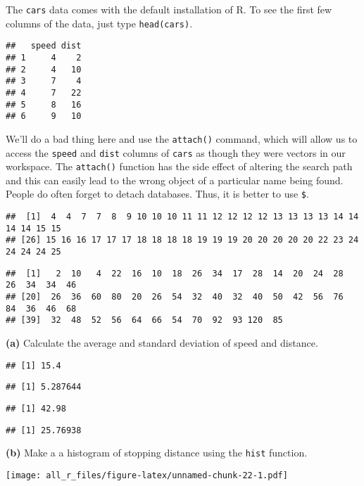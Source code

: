 \documentclass[
]{article}
\begin{document}
The \texttt{cars} data comes with the default installation of R. To see
the first few columns of the data, just type \texttt{head(cars)}.

\begin{verbatim}
##   speed dist
## 1     4    2
## 2     4   10
## 3     7    4
## 4     7   22
## 5     8   16
## 6     9   10
\end{verbatim}

We'll do a bad thing here and use the \texttt{attach()} command, which
will allow us to access the \texttt{speed} and \texttt{dist} columns of
\texttt{cars} as though they were vectors in our workspace. The
\texttt{attach()} function has the side effect of altering the search
path and this can easily lead to the wrong object of a particular name
being found. People do often forget to detach databases. Thus, it is
better to use \texttt{\$}.

\begin{verbatim}
##  [1]  4  4  7  7  8  9 10 10 10 11 11 12 12 12 12 13 13 13 13 14 14 14 14 15 15
## [26] 15 16 16 17 17 17 18 18 18 18 19 19 19 20 20 20 20 20 22 23 24 24 24 24 25
\end{verbatim}

\begin{verbatim}
##  [1]   2  10   4  22  16  10  18  26  34  17  28  14  20  24  28  26  34  34  46
## [20]  26  36  60  80  20  26  54  32  40  32  40  50  42  56  76  84  36  46  68
## [39]  32  48  52  56  64  66  54  70  92  93 120  85
\end{verbatim}

\textbf{(a)} Calculate the average and standard deviation of speed and
distance.

\begin{verbatim}
## [1] 15.4
\end{verbatim}

\begin{verbatim}
## [1] 5.287644
\end{verbatim}

\begin{verbatim}
## [1] 42.98
\end{verbatim}

\begin{verbatim}
## [1] 25.76938
\end{verbatim}

\textbf{(b)} Make a a histogram of stopping distance using the
\texttt{hist} function.

\texttt{[image: all\_r\_files/figure-latex/unnamed-chunk-22-1.pdf]}
\end{document}

